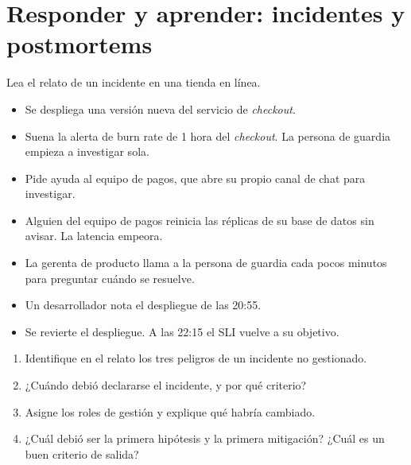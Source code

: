 \documentclass[variant=guia,cover=institutional,mode=screen]{ua-engineering-v6-article}
\begin{document}
\section{Responder y aprender: incidentes y postmortems}
\begin{uaexercise}
Lea el relato de un incidente en una tienda en línea.
\begin{itemize}[leftmargin=3.6em, labelsep=0.6em]
\item[20:55] Se despliega una versión nueva del servicio de \emph{checkout}.
\item[21:10] Suena la alerta de burn rate de 1 hora del \emph{checkout}. La persona de guardia empieza a investigar sola.
\item[21:25] Pide ayuda al equipo de pagos, que abre su propio canal de chat para investigar.
\item[21:30] Alguien del equipo de pagos reinicia las réplicas de su base de datos sin avisar. La latencia empeora.
\item[21:35] La gerenta de producto llama a la persona de guardia cada pocos minutos para preguntar cuándo se resuelve.
\item[22:00] Un desarrollador nota el despliegue de las 20:55.
\item[22:05] Se revierte el despliegue. A las 22:15 el SLI vuelve a su objetivo.
\end{itemize}
\begin{enumerate}
\item Identifique en el relato los tres peligros de un incidente no gestionado.
\item ¿Cuándo debió declararse el incidente, y por qué criterio?
\item Asigne los roles de gestión y explique qué habría cambiado.
\item ¿Cuál debió ser la primera hipótesis y la primera mitigación? ¿Cuál es un buen criterio de salida?
\end{enumerate}
\end{uaexercise}
\end{document}
